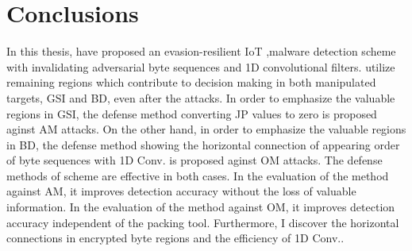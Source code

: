 \chapter{Conclusions}\label{sec:conclusion}
In this thesis, \we have proposed an evasion-resilient IoT ,malware detection scheme with invalidating adversarial byte sequences and 1D convolutional filters. 
\We utilize remaining regions which contribute to decision making in both manipulated targets, GSI and BD, even after the attacks.
In order to emphasize the valuable regions in GSI, the defense method converting JP values to zero is proposed aginst AM attacks.
On the other hand, in order to emphasize the valuable regions in BD, the defense method showing the horizontal connection of appearing order of byte sequences with 1D Conv. is proposed aginst OM attacks.
The defense methods of \our scheme are effective in both cases.
In the evaluation of the method against AM, it improves detection accuracy without the loss of valuable information.
In the evaluation of the method against OM, it improves detection accuracy independent of the packing tool.
Furthermore, I discover the horizontal connections in encrypted byte regions and the efficiency of 1D Conv..

